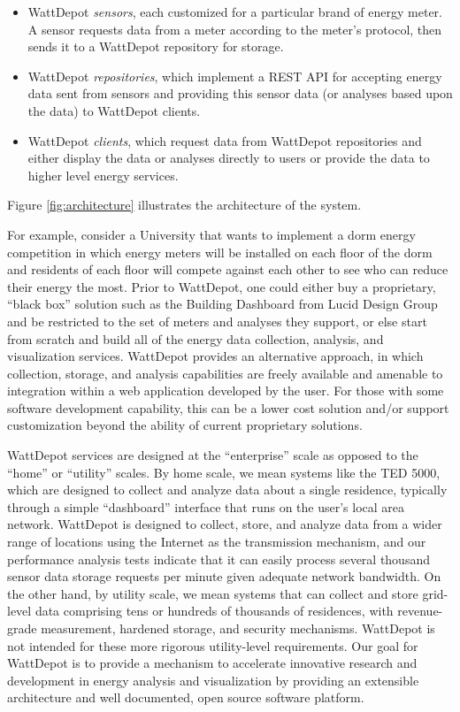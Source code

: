 \documentclass[conference,compsoc]{IEEEtran}
\begin{document}
\begin{itemize}
\item WattDepot {\em sensors}, each customized for a particular brand of
energy meter.  A sensor requests data from a meter according to the meter's
protocol, then sends it to a WattDepot repository for storage.

\item WattDepot {\em repositories}, which implement a REST \cite{REST} API
for accepting energy data sent from sensors and providing this sensor data
(or analyses based upon the data) to WattDepot clients.

\item WattDepot {\em clients}, which request data from WattDepot
repositories and either display the data or analyses directly to users or
provide the data to higher level energy services.
\end{itemize}

Figure \ref{fig:architecture} illustrates the architecture of the system.


For example, consider a University that wants to implement a dorm energy
competition in which energy meters will be installed on each floor of the
dorm and residents of each floor will compete against each other to see who
can reduce their energy the most.  Prior to WattDepot, one could either buy a
proprietary, ``black box'' solution such as the Building Dashboard from
Lucid Design Group and be restricted to the set of meters and analyses they
support, or else start from scratch and build all of the energy data
collection, analysis, and visualization services.  WattDepot provides an
alternative approach, in which collection, storage, and analysis
capabilities are freely available and amenable to integration within a web
application developed by the user.  For those with some software
development capability, this can be a lower cost solution and/or support
customization beyond the ability of current proprietary solutions.

WattDepot services are designed at the ``enterprise'' scale as opposed to
the ``home'' or ``utility'' scales.  By home scale, we mean systems like
the TED 5000, which are designed to collect and analyze data about a single
residence, typically through a simple ``dashboard'' interface that runs on
the user's local area network.  WattDepot is designed to
collect, store, and analyze data from a wider range of locations using the
Internet as the transmission mechanism, and our performance analysis tests
indicate that it can easily process several thousand sensor data storage
requests per minute given adequate network bandwidth.  On the other hand,
by utility scale, we mean systems that can collect and store grid-level
data comprising tens or hundreds of thousands of residences, with
revenue-grade measurement, hardened storage, and security mechanisms.
WattDepot is not intended for these more rigorous utility-level
requirements.  Our goal for WattDepot is to provide a mechanism to
accelerate innovative research and development in energy analysis and
visualization by providing an extensible architecture and well documented,
open source software platform.
\end{document}
